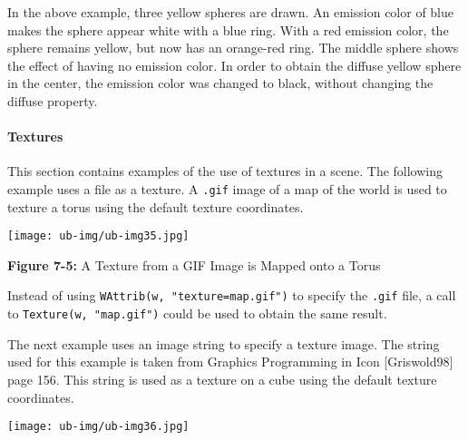 \bigskip


In the above example, three yellow spheres are drawn. An emission
color of blue makes the sphere appear white with a blue ring. With a
red emission color, the sphere remains yellow, but now has an
orange-red ring. The middle sphere shows the effect of having no
emission color. In order to obtain the diffuse yellow sphere in the
center, the emission color was changed to black, without changing the
diffuse property.

\paragraph{Textures}
This section contains examples of the use of textures in a scene. The
following example uses a file as a texture. A \texttt{.gif} image of a
map of the world is used to texture a torus using the default texture
coordinates.

\bigskip

{\centering
\texttt{[image: ub-img/ub-img35.jpg]}
\par}

{\sffamily\bfseries Figure 7-5:}
{\sffamily A Texture from a GIF Image is Mapped onto a Torus}


Instead of using \texttt{WAttrib(w, "texture=map.gif")} to specify the
\texttt{.gif} file, a call to \texttt{Texture(w, "map.gif")} could be
used to obtain the same result.

The next example uses an image string to specify a texture image. The
string used for this example is taken from Graphics Programming in
Icon [Griswold98] page 156. This string is used as a texture on a cube
using the default texture coordinates.

\bigskip

{\centering
\texttt{[image: ub-img/ub-img36.jpg]}
\par}

